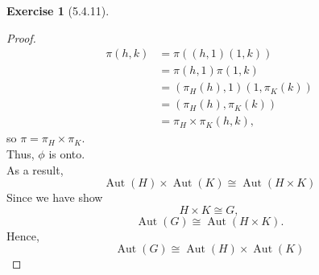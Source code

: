 \documentclass{amsart}
\theoremstyle{plain}
\theoremstyle{definition}
\newtheorem{exer}[lem]{Exercise}
\begin{document}
\begin{exer}[5.4.11]
\begin{proof}
	\begin{align*}
	  \pi(h,k) &= \pi((h,1)(1,k)) \\
	  		   &=\pi(h,1) \pi(1,k) \\
	  		   &=\left(\pi_H(h),1\right) \left(1,\pi_K(k)\right) \\
	  		   &=\left(\pi_H(h), \pi_K(k)\right) \\
	  		   &= \pi_H \times \pi_K (h,k),
	\end{align*}
	so $\pi = \pi_H \times \pi_K$.\\
	Thus, $\phi$ is onto.\\
	As a result, 
	\[\operatorname{Aut}(H) \times \operatorname{Aut}(K) \cong \operatorname{Aut}(H \times K) \]
   Since we have show 
   \[ H\times K \cong G,\] 
   \[\operatorname{Aut}(G) \cong \operatorname{Aut}(H \times K).\]
   Hence,
   \[\operatorname{Aut}(G) \cong \operatorname{Aut}(H) \times \operatorname{Aut}(K)\]
\end{proof}


\end{exer}
\end{document}

